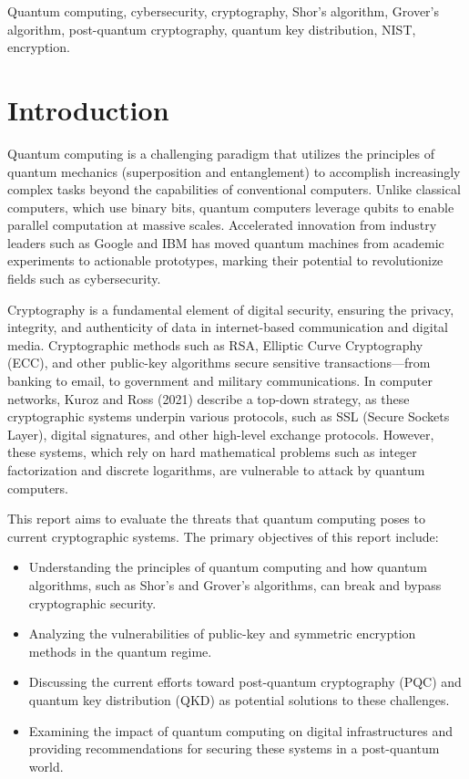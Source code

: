 \documentclass[conference]{IEEEtran}
\begin{document}
\begin{IEEEkeywords}
    Quantum computing, cybersecurity, cryptography, Shor’s algorithm, Grover’s algorithm, post-quantum cryptography, quantum key distribution, NIST, encryption.
\end{IEEEkeywords}
    
\section{Introduction}

Quantum computing is a challenging paradigm that utilizes the principles of quantum mechanics (superposition and entanglement) to accomplish increasingly complex tasks beyond the capabilities of conventional computers. Unlike classical computers, which use binary bits, quantum computers leverage qubits to enable parallel computation at massive scales. Accelerated innovation from industry leaders such as Google and IBM has moved quantum machines from academic experiments to actionable prototypes, marking their potential to revolutionize fields such as cybersecurity.

Cryptography is a fundamental element of digital security, ensuring the privacy, integrity, and authenticity of data in internet-based communication and digital media. Cryptographic methods such as RSA, Elliptic Curve Cryptography (ECC), and other public-key algorithms secure sensitive transactions—from banking to email, to government and military communications. In computer networks, Kuroz and Ross (2021) describe a top-down strategy, as these cryptographic systems underpin various protocols, such as SSL (Secure Sockets Layer), digital signatures, and other high-level exchange protocols. However, these systems, which rely on hard mathematical problems such as integer factorization and discrete logarithms, are vulnerable to attack by quantum computers.

This report aims to evaluate the threats that quantum computing poses to current cryptographic systems. The primary objectives of this report include:
\begin{itemize}
    \item Understanding the principles of quantum computing and how quantum algorithms, such as Shor's and Grover's algorithms, can break and bypass cryptographic security.
    \item Analyzing the vulnerabilities of public-key and symmetric encryption methods in the quantum regime.
    \item Discussing the current efforts toward post-quantum cryptography (PQC) and quantum key distribution (QKD) as potential solutions to these challenges.
    \item Examining the impact of quantum computing on digital infrastructures and providing recommendations for securing these systems in a post-quantum world.
\end{itemize}
\end{document}
